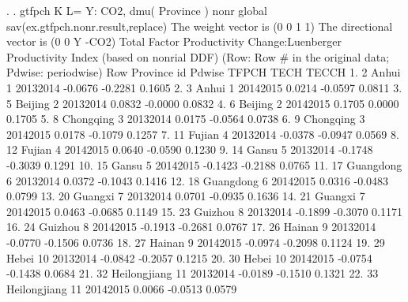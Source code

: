 . 
. gtfpch K L= Y: CO2, dmu( Province ) nonr  global sav(ex.gtfpch.nonr.result,replace)
{\smallskip}
 The weight vector is (0 0 1 1)
{\smallskip}
 The directional vector is (0 0 Y -CO2)
{\smallskip}
{\smallskip}
 Total Factor Productivity Change:Luenberger Productivity Index (based on nonrial DDF)
    (Row: Row \# in the original data; Pdwise: periodwise)
{\smallskip}
     {\TLC}
     {\VBAR} Row       Province   id      Pdwise     TFPCH      TECH    TECCH {\VBAR}
     {\LFTT}
  1. {\VBAR}   2          Anhui    1   2013{\tytilde}2014   -0.0676   -0.2281   0.1605 {\VBAR}
  2. {\VBAR}   3          Anhui    1   2014{\tytilde}2015    0.0214   -0.0597   0.0811 {\VBAR}
  3. {\VBAR}   5        Beijing    2   2013{\tytilde}2014    0.0832   -0.0000   0.0832 {\VBAR}
  4. {\VBAR}   6        Beijing    2   2014{\tytilde}2015    0.1705    0.0000   0.1705 {\VBAR}
  5. {\VBAR}   8      Chongqing    3   2013{\tytilde}2014    0.0175   -0.0564   0.0738 {\VBAR}
  6. {\VBAR}   9      Chongqing    3   2014{\tytilde}2015    0.0178   -0.1079   0.1257 {\VBAR}
  7. {\VBAR}  11         Fujian    4   2013{\tytilde}2014   -0.0378   -0.0947   0.0569 {\VBAR}
  8. {\VBAR}  12         Fujian    4   2014{\tytilde}2015    0.0640   -0.0590   0.1230 {\VBAR}
  9. {\VBAR}  14          Gansu    5   2013{\tytilde}2014   -0.1748   -0.3039   0.1291 {\VBAR}
 10. {\VBAR}  15          Gansu    5   2014{\tytilde}2015   -0.1423   -0.2188   0.0765 {\VBAR}
 11. {\VBAR}  17      Guangdong    6   2013{\tytilde}2014    0.0372   -0.1043   0.1416 {\VBAR}
 12. {\VBAR}  18      Guangdong    6   2014{\tytilde}2015    0.0316   -0.0483   0.0799 {\VBAR}
 13. {\VBAR}  20        Guangxi    7   2013{\tytilde}2014    0.0701   -0.0935   0.1636 {\VBAR}
 14. {\VBAR}  21        Guangxi    7   2014{\tytilde}2015    0.0463   -0.0685   0.1149 {\VBAR}
 15. {\VBAR}  23        Guizhou    8   2013{\tytilde}2014   -0.1899   -0.3070   0.1171 {\VBAR}
 16. {\VBAR}  24        Guizhou    8   2014{\tytilde}2015   -0.1913   -0.2681   0.0767 {\VBAR}
 17. {\VBAR}  26         Hainan    9   2013{\tytilde}2014   -0.0770   -0.1506   0.0736 {\VBAR}
 18. {\VBAR}  27         Hainan    9   2014{\tytilde}2015   -0.0974   -0.2098   0.1124 {\VBAR}
 19. {\VBAR}  29          Hebei   10   2013{\tytilde}2014   -0.0842   -0.2057   0.1215 {\VBAR}
 20. {\VBAR}  30          Hebei   10   2014{\tytilde}2015   -0.0754   -0.1438   0.0684 {\VBAR}
 21. {\VBAR}  32   Heilongjiang   11   2013{\tytilde}2014   -0.0189   -0.1510   0.1321 {\VBAR}
 22. {\VBAR}  33   Heilongjiang   11   2014{\tytilde}2015    0.0066   -0.0513   0.0579 {\VBAR}
